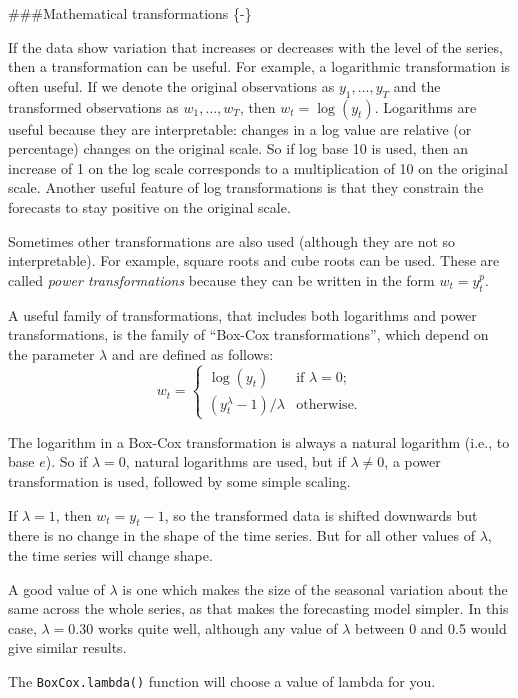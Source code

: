 \documentclass[]{book}
\begin{document}
\#\#\#Mathematical transformations \{-\}

If the data show variation that increases or decreases with the level of the series, then a transformation can be useful. For example, a logarithmic transformation is often useful. If we denote the original observations as \(y_{1},\dots,y_{T}\) and the transformed observations as \(w_{1}, \dots, w_{T}\), then \(w_t = \log(y_t)\). Logarithms are useful because they are interpretable: changes in a log value are relative (or percentage) changes on the original scale. So if log base 10 is used, then an increase of 1 on the log scale corresponds to a multiplication of 10 on the original scale. Another useful feature of log transformations is that they constrain the forecasts to stay positive on the original scale.

Sometimes other transformations are also used (although they are not so interpretable). For example, square roots and cube roots can be used. These are called \emph{power transformations} because they can be written in the form \(w_{t} = y_{t}^p\).

A useful family of transformations, that includes both logarithms and power transformations, is the family of ``Box-Cox transformations'', which depend on the parameter \(\lambda\) and are defined as follows:
\[
  w_t  =
    \begin{cases}
      \log(y_t) & \text{if $\lambda=0$};  \\
      (y_t^\lambda-1)/\lambda & \text{otherwise}.
    \end{cases}
\]

The logarithm in a Box-Cox transformation is always a natural logarithm (i.e., to base \(e\)). So if \(\lambda=0\), natural logarithms are used, but if \(\lambda\ne0\), a power transformation is used, followed by some simple scaling.

If \(\lambda=1\), then \(w_t = y_t-1\), so the transformed data is shifted downwards but there is no change in the shape of the time series. But for all other values of \(\lambda\), the time series will change shape.

A good value of \(\lambda\) is one which makes the size of the seasonal variation about the same across the whole series, as that makes the forecasting model simpler. In this case, \(\lambda=0.30\) works quite well, although any value of \(\lambda\) between 0 and 0.5 would give similar results.

The \texttt{BoxCox.lambda()} function will choose a value of lambda for you.
\end{document}
